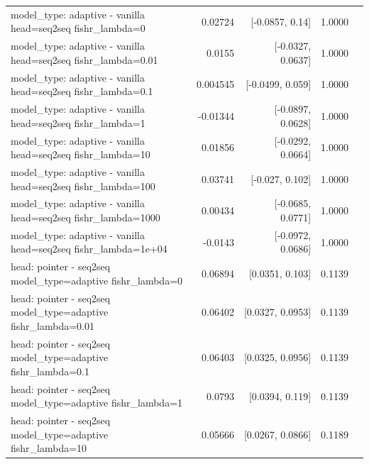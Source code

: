 \documentclass[10pt]{article}
\makeatletter
\newcommand{\stackcell}[1]{\begin{tabular}[t]{@{}l@{}}#1\end{tabular}}
\makeatother
\begin{document}
{\begin{longtable}{lrrrl}
\stackcell{model\_type: adaptive - vanilla\\\footnotesize head=seq2seq fishr\_lambda=0 } & 0.02724 & [-0.0857, 0.14] & 1.0000 & \\
\stackcell{model\_type: adaptive - vanilla\\\footnotesize head=seq2seq fishr\_lambda=0.01 } & 0.0155 & [-0.0327, 0.0637] & 1.0000 & \\
\stackcell{model\_type: adaptive - vanilla\\\footnotesize head=seq2seq fishr\_lambda=0.1 } & 0.004545 & [-0.0499, 0.059] & 1.0000 & \\
\stackcell{model\_type: adaptive - vanilla\\\footnotesize head=seq2seq fishr\_lambda=1 } & -0.01344 & [-0.0897, 0.0628] & 1.0000 & \\
\stackcell{model\_type: adaptive - vanilla\\\footnotesize head=seq2seq fishr\_lambda=10 } & 0.01856 & [-0.0292, 0.0664] & 1.0000 & \\
\stackcell{model\_type: adaptive - vanilla\\\footnotesize head=seq2seq fishr\_lambda=100 } & 0.03741 & [-0.027, 0.102] & 1.0000 & \\
\stackcell{model\_type: adaptive - vanilla\\\footnotesize head=seq2seq fishr\_lambda=1000 } & 0.00434 & [-0.0685, 0.0771] & 1.0000 & \\
\stackcell{model\_type: adaptive - vanilla\\\footnotesize head=seq2seq fishr\_lambda=1e+04 } & -0.0143 & [-0.0972, 0.0686] & 1.0000 & \\
\stackcell{head: pointer - seq2seq\\\footnotesize model\_type=adaptive fishr\_lambda=0 } & 0.06894 & [0.0351, 0.103] & 0.1139 & \\
\stackcell{head: pointer - seq2seq\\\footnotesize model\_type=adaptive fishr\_lambda=0.01 } & 0.06402 & [0.0327, 0.0953] & 0.1139 & \\
\stackcell{head: pointer - seq2seq\\\footnotesize model\_type=adaptive fishr\_lambda=0.1 } & 0.06403 & [0.0325, 0.0956] & 0.1139 & \\
\stackcell{head: pointer - seq2seq\\\footnotesize model\_type=adaptive fishr\_lambda=1 } & 0.0793 & [0.0394, 0.119] & 0.1139 & \\
\stackcell{head: pointer - seq2seq\\\footnotesize model\_type=adaptive fishr\_lambda=10 } & 0.05666 & [0.0267, 0.0866] & 0.1189 & \\

\end{longtable}}
\end{document}
